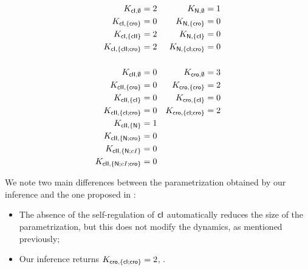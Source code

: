 \begin{table}[t]
\begin{align*}
  K_{\mathsf{cI}, \emptyset} &= 2 &
  K_{\mathsf{N}, \emptyset} &= 1\\
  K_{\mathsf{cI}, \{\mathsf{cro}\}} &= 0&
  K_{\mathsf{N}, \{\mathsf{cro}\}} &= 0\\
  K_{\mathsf{cI}, \{\mathsf{cII}\}} &= 2&
  K_{\mathsf{N}, \{\mathsf{cI}\}} &= 0\\
  K_{\mathsf{cI}, \{\mathsf{cII};\mathsf{cro}\}} &= 2&
  K_{\mathsf{N}, \{\mathsf{cI};\mathsf{cro}\}} &= 0\\
  \\
  K_{\mathsf{cII}, \emptyset} &= 0&
  K_{\mathsf{cro}, \emptyset} &= 3\\
  K_{\mathsf{cII}, \{\mathsf{cro}\}} &= 0&
  K_{\mathsf{cro}, \{\mathsf{cro}\}} &= 2\\
  K_{\mathsf{cII}, \{\mathsf{cI}\}} &= 0&
  K_{\mathsf{cro}, \{\mathsf{cI}\}} &= 0\\
  K_{\mathsf{cII}, \{\mathsf{cI};\mathsf{cro}\}} &= 0&
  K_{\mathsf{cro}, \{\mathsf{cI};\mathsf{cro}\}} &= 2\\
  K_{\mathsf{cII}, \{\mathsf{N}\}} &= 1\\
  K_{\mathsf{cII}, \{\mathsf{N};\mathsf{cro}\}} &= 0\\
  K_{\mathsf{cII}, \{\mathsf{N};cI\}} &= 0\\
  K_{\mathsf{cII}, \{\mathsf{N};cI;\mathsf{cro}\}} &= 0
\end{align*}
\caption{\label{tb:phage-lambda-k}%
  Result of the parameters inference performed on the Process Hitting model
  of the phage lambda immunity response
  taken from \cite{thieffry_dynamical_1995}.
}
\end{table}

We note two main differences between the parametrization obtained by our inference
and the one proposed in \cite{thieffry_dynamical_1995}:
\begin{itemize}
  \item The absence of the self-regulation of $\mathsf{cI}$ automatically reduces the size
    of the parametrization, but this does not modify the dynamics, as mentioned previously;
  \item Our inference returns $K_{\mathsf{cro}, \{\mathsf{cI};\mathsf{cro}\}} = 2$, .
\end{itemize}
